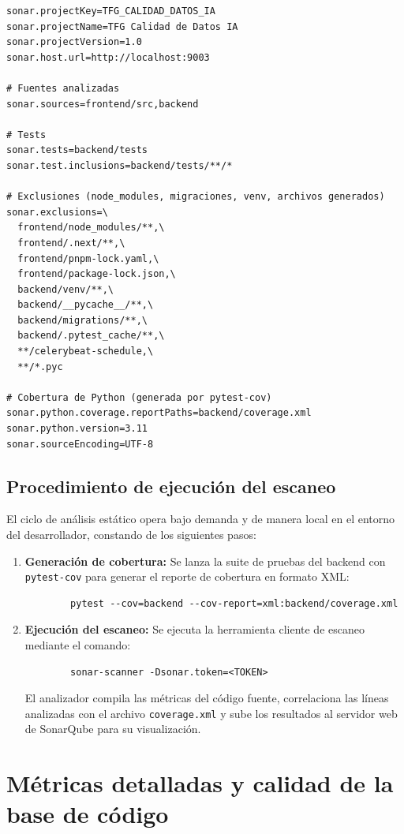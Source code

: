 \begin{verbatim}
sonar.projectKey=TFG_CALIDAD_DATOS_IA
sonar.projectName=TFG Calidad de Datos IA
sonar.projectVersion=1.0
sonar.host.url=http://localhost:9003

# Fuentes analizadas
sonar.sources=frontend/src,backend

# Tests
sonar.tests=backend/tests
sonar.test.inclusions=backend/tests/**/*

# Exclusiones (node_modules, migraciones, venv, archivos generados)
sonar.exclusions=\
  frontend/node_modules/**,\
  frontend/.next/**,\
  frontend/pnpm-lock.yaml,\
  frontend/package-lock.json,\
  backend/venv/**,\
  backend/__pycache__/**,\
  backend/migrations/**,\
  backend/.pytest_cache/**,\
  **/celerybeat-schedule,\
  **/*.pyc

# Cobertura de Python (generada por pytest-cov)
sonar.python.coverage.reportPaths=backend/coverage.xml
sonar.python.version=3.11
sonar.sourceEncoding=UTF-8
\end{verbatim}

\subsection*{Procedimiento de ejecución del escaneo}
El ciclo de análisis estático opera bajo demanda y de manera local en el entorno del desarrollador, constando de los siguientes pasos:
\begin{enumerate}
  \item \textbf{Generación de cobertura:} Se lanza la suite de pruebas del backend con \texttt{pytest-cov} para generar el reporte de cobertura en formato XML:
        \begin{verbatim}
        pytest --cov=backend --cov-report=xml:backend/coverage.xml
        \end{verbatim}
  \item \textbf{Ejecución del escaneo:} Se ejecuta la herramienta cliente de escaneo mediante el comando:
        \begin{verbatim}
        sonar-scanner -Dsonar.token=<TOKEN>
        \end{verbatim}
        El analizador compila las métricas del código fuente, correlaciona las líneas analizadas con el archivo \texttt{coverage.xml} y sube los resultados al servidor web de SonarQube para su visualización.
\end{enumerate}

\section{Métricas detalladas y calidad de la base de código}
\label{sec:sonar-metrics}

